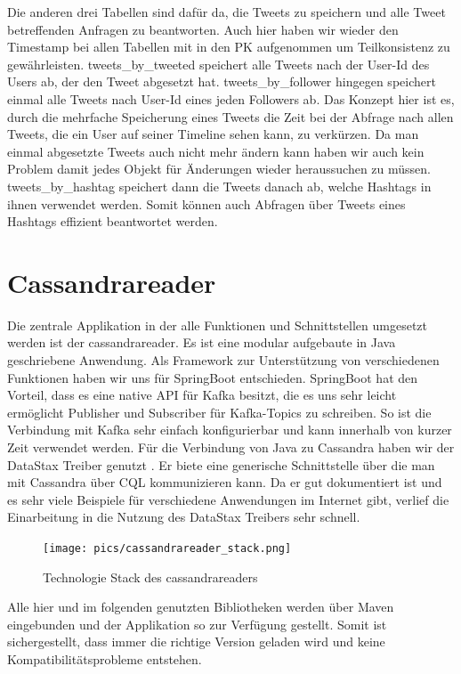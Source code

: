 Die anderen drei Tabellen sind dafür da, die Tweets zu speichern und alle Tweet betreffenden Anfragen zu beantworten. Auch hier haben wir wieder den Timestamp bei allen Tabellen mit in den PK aufgenommen um Teilkonsistenz zu gewährleisten. tweets\_by\_tweeted speichert alle Tweets nach der User-Id des Users ab, der den Tweet abgesetzt hat. tweets\_by\_follower hingegen speichert einmal alle Tweets nach User-Id eines jeden Followers ab. Das Konzept hier ist es, durch die mehrfache Speicherung eines Tweets die Zeit bei der Abfrage nach allen Tweets, die ein User auf seiner Timeline sehen kann, zu verkürzen. Da man einmal abgesetzte Tweets auch nicht mehr ändern kann haben wir auch kein Problem damit jedes Objekt für Änderungen wieder heraussuchen zu müssen. tweets\_by\_hashtag speichert dann die Tweets danach ab, welche Hashtags in ihnen verwendet werden. Somit können auch Abfragen über Tweets eines Hashtags effizient beantwortet werden.

\section{Cassandrareader}
Die zentrale Applikation in der alle Funktionen und Schnittstellen umgesetzt werden ist der cassandrareader. Es ist eine modular aufgebaute in Java geschriebene Anwendung. Als Framework zur Unterstützung von verschiedenen Funktionen haben wir uns für SpringBoot entschieden. SpringBoot hat den Vorteil, dass es eine native API für Kafka besitzt, die es uns sehr leicht ermöglicht Publisher und Subscriber für Kafka-Topics zu schreiben. So ist die Verbindung mit Kafka sehr einfach konfigurierbar und kann innerhalb von kurzer Zeit verwendet werden. Für die Verbindung von Java zu Cassandra haben wir der DataStax Treiber genutzt \cite{DataStax}. Er biete eine generische Schnittstelle über die man mit Cassandra über CQL kommunizieren kann. Da er gut dokumentiert ist und es sehr viele Beispiele für verschiedene Anwendungen im Internet gibt, verlief die Einarbeitung in die Nutzung des DataStax Treibers sehr schnell.
\begin{figure}[htbp]
	\centering
	\texttt{[image: pics/cassandrareader\_stack.png]}
	\caption{Technologie Stack des cassandrareaders}
	\label{fig:techStackCass}
\end{figure}
Alle hier und im folgenden genutzten Bibliotheken werden über Maven eingebunden und der Applikation so zur Verfügung gestellt. Somit ist sichergestellt, dass immer die richtige Version geladen wird und keine Kompatibilitätsprobleme entstehen.

